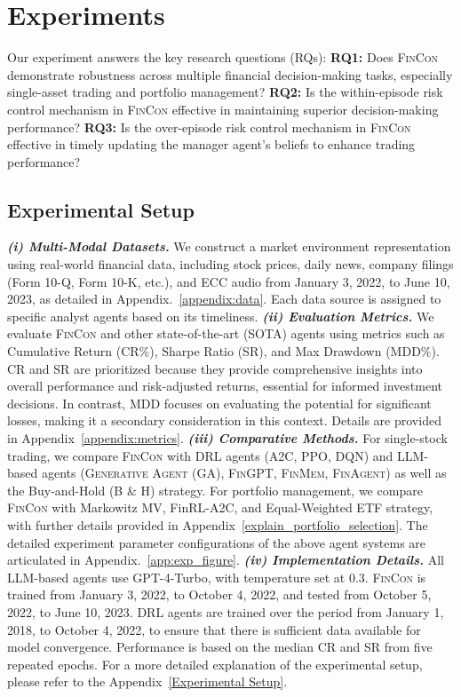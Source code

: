 \section{Experiments}
Our experiment answers the key research questions (RQs): \textbf{RQ1:} Does \textsc{FinCon} demonstrate robustness across multiple financial decision-making tasks, especially single-asset trading and portfolio management? \textbf{RQ2:} Is the within-episode risk control mechanism in \textsc{FinCon} effective in maintaining superior decision-making performance? \textbf{RQ3:} Is the over-episode risk control mechanism in \textsc{FinCon} effective in timely updating the manager agent's beliefs to enhance trading performance?

\subsection{Experimental Setup}

\textit{\textbf{(i) Multi-Modal Datasets.}} We construct a market environment representation using real-world financial data, including stock prices, daily news, company filings (Form 10-Q, Form 10-K, etc.), and ECC audio from January 3, 2022, to June 10, 2023, as detailed in Appendix.~\ref{appendix:data}. Each data source is assigned to specific analyst agents based on its timeliness. \textit{\textbf{(ii) Evaluation Metrics.}} We evaluate \textsc{FinCon} and other state-of-the-art (SOTA) agents using metrics such as Cumulative Return (CR\%), Sharpe Ratio (SR), and Max Drawdown (MDD\%). CR and SR are prioritized because they provide comprehensive insights into overall performance and risk-adjusted returns, essential for informed investment decisions. In contrast, MDD focuses on evaluating the potential for significant losses, making it a secondary consideration in this context. Details are provided in Appendix~\ref{appendix:metrics}. \textit{\textbf{(iii) Comparative Methods.}} For single-stock trading, we compare \textsc{FinCon} with DRL agents (A2C, PPO, DQN) and LLM-based agents (\textsc{Generative Agent (GA)}, \textsc{FinGPT}, \textsc{FinMem}, \textsc{FinAgent}) as well as the Buy-and-Hold (B \& H) strategy. For portfolio management, we compare \textsc{FinCon} with Markowitz MV, FinRL-A2C, and Equal-Weighted ETF strategy, with further details provided in Appendix~\ref{explain_portfolio_selection}. The detailed experiment parameter configurations of the above agent systems are articulated in Appendix.~\ref{app:exp_figure}. \textit{\textbf{(iv) Implementation Details.}} All LLM-based agents use GPT-4-Turbo, with temperature set at 0.3. \textsc{FinCon} is trained from January 3, 2022, to October 4, 2022, and tested from October 5, 2022, to June 10, 2023. DRL agents are trained over the period from January 1, 2018, to October 4, 2022, to ensure that there is sufficient data available for model convergence. Performance is based on the median CR and SR from five repeated epochs. For a more detailed explanation of the experimental setup, please refer to the Appendix~\ref{Experimental Setup}.

